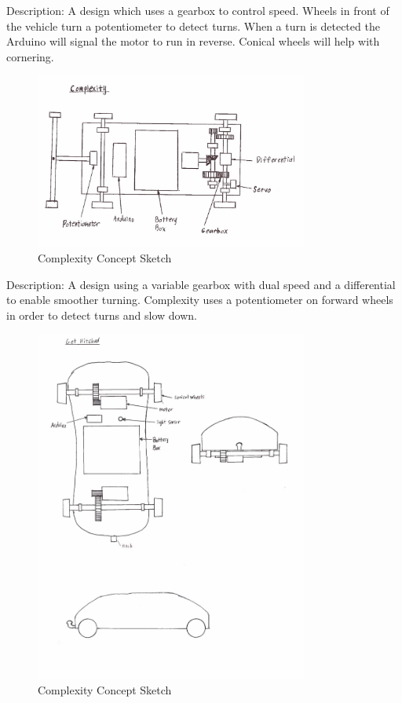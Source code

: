 \documentclass[class=../report, crop=false]{standalone}
\begin{document}
Description: A design which uses a gearbox to control speed.
Wheels in front of the vehicle turn a potentiometer to detect turns.
When a turn is detected the Arduino will signal the motor to run in reverse.
Conical wheels will help with cornering.

\clearpage

\begin{figure}[H]
	\centering
	\includegraphics[width=0.8\textwidth]{../../res/img/complexity}
	\caption{Complexity Concept Sketch}
	\label{app/fig:complexity}
\end{figure}

Description: A design using a variable gearbox with dual speed and a differential to enable smoother turning.
Complexity uses a potentiometer on forward wheels in order to detect turns and slow down.

\clearpage

\begin{figure}[H]
	\centering
	\includegraphics[width=0.8\textwidth]{../../res/img/gethitched}
	\caption{Complexity Concept Sketch}
	\label{app/fig:gethitched}
\end{figure}
\end{document}
